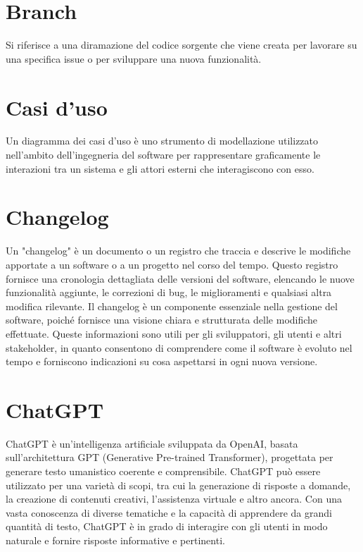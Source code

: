 \documentclass{article}
\begin{document}
\section{Branch}
Si riferisce a una diramazione del codice sorgente che viene creata per lavorare su una specifica issue o per sviluppare una nuova funzionalità. 

\section{Casi d'uso}
Un diagramma dei casi d'uso è uno strumento di modellazione utilizzato nell'ambito dell'ingegneria del software per rappresentare graficamente le interazioni tra un sistema e gli attori esterni che interagiscono con esso.

\section{Changelog}
Un "changelog" è un documento o un registro che traccia e descrive le modifiche apportate a un software o a un progetto nel corso del tempo. Questo registro fornisce una cronologia dettagliata delle versioni del software, elencando le nuove funzionalità aggiunte, le correzioni di bug, le miglioramenti e qualsiasi altra modifica rilevante. Il changelog è un componente essenziale nella gestione del software, poiché fornisce una visione chiara e strutturata delle modifiche effettuate. Queste informazioni sono utili per gli sviluppatori, gli utenti e altri stakeholder, in quanto consentono di comprendere come il software è evoluto nel tempo e forniscono indicazioni su cosa aspettarsi in ogni nuova versione.

\section{ChatGPT}
ChatGPT è un'intelligenza artificiale sviluppata da OpenAI, basata sull'architettura GPT (Generative Pre-trained Transformer), progettata per generare testo umanistico coerente e comprensibile. ChatGPT può essere utilizzato per una varietà di scopi, tra cui la generazione di risposte a domande, la creazione di contenuti creativi, l'assistenza virtuale e altro ancora. Con una vasta conoscenza di diverse tematiche e la capacità di apprendere da grandi quantità di testo, ChatGPT è in grado di interagire con gli utenti in modo naturale e fornire risposte informative e pertinenti.
\end{document}
